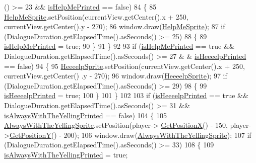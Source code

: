 \begin{DoxyCode}
      () >= 23 && \hyperlink{classDialogue_a8b9eaef2c248ac01a1e9d3fc3a3ccf1d}{isHelpMePrinted} == \textcolor{keyword}{false})
84         \{
85             \hyperlink{classDialogue_a086dc209cfb24662dd190a6c5120d70c}{HelpMeSprite}.setPosition(currentView.getCenter().x + 250, currentView.getCenter().y
       - 270);
86             window.draw(\hyperlink{classDialogue_a086dc209cfb24662dd190a6c5120d70c}{HelpMeSprite});
87             \textcolor{keywordflow}{if} (DialogueDuration.getElapsedTime().asSeconds() >= 25)
88             \{
89                \hyperlink{classDialogue_a8b9eaef2c248ac01a1e9d3fc3a3ccf1d}{isHelpMePrinted} = \textcolor{keyword}{true};
90             \}
91         \}
92 
93         \textcolor{keywordflow}{if} (\hyperlink{classDialogue_a8b9eaef2c248ac01a1e9d3fc3a3ccf1d}{isHelpMePrinted} == \textcolor{keyword}{true} && DialogueDuration.getElapsedTime().asSeconds() >= 27 &
      & \hyperlink{classDialogue_ad4110b8446ddc8c6c3b2371f53b081d0}{isHeeeelpPrinted} == \textcolor{keyword}{false})
94         \{
95             \hyperlink{classDialogue_aca454b4e5d23ecedd588615820a60179}{HeeeelpSprite}.setPosition(currentView.getCenter().x + 250, currentView.getCenter()
      .y - 270);
96             window.draw(\hyperlink{classDialogue_aca454b4e5d23ecedd588615820a60179}{HeeeelpSprite});
97              \textcolor{keywordflow}{if} (DialogueDuration.getElapsedTime().asSeconds() >= 29)
98              \{
99                \hyperlink{classDialogue_ad4110b8446ddc8c6c3b2371f53b081d0}{isHeeeelpPrinted} = \textcolor{keyword}{true};
100              \}
101          \}
102 
103         \textcolor{keywordflow}{if} (\hyperlink{classDialogue_ad4110b8446ddc8c6c3b2371f53b081d0}{isHeeeelpPrinted} == \textcolor{keyword}{true} && DialogueDuration.getElapsedTime().asSeconds() >= 31
       && \hyperlink{classDialogue_a068902d456ee99ed23d2849d4e66a917}{isAlwaysWithTheYellingPrinted} == \textcolor{keyword}{false})
104         \{
105             \hyperlink{classDialogue_a1eea5e12afbaad687a4eb3b17ddf1b3e}{AlwaysWithTheYellingSprite}.setPosition(player->
      \hyperlink{classPlayerObject_aa84a7779304b680fa32b88b01ba95d02}{GetPositionX}() - 150, player->\hyperlink{classPlayerObject_ad17b9ec44299f4dc9ca20064c883496b}{GetPositionY}() - 200);
106             window.draw(\hyperlink{classDialogue_a1eea5e12afbaad687a4eb3b17ddf1b3e}{AlwaysWithTheYellingSprite});
107             \textcolor{keywordflow}{if} (DialogueDuration.getElapsedTime().asSeconds() >= 33)
108             \{
109                \hyperlink{classDialogue_a068902d456ee99ed23d2849d4e66a917}{isAlwaysWithTheYellingPrinted} = \textcolor{keyword}{true};

\end{DoxyCode}
